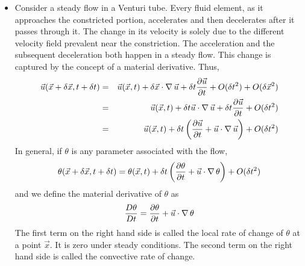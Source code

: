 \begin{itemize}
\item Consider a steady flow in a Venturi tube. Every fluid element, as it approaches the constricted portion, accelerates and then decelerates after it passes through it. The change in
its velocity is solely due to the different velocity field prevalent near the constriction. The acceleration and the subsequent deceleration both happen in a steady flow. This change is
captured by the concept of a material derivative. Thus,
\begin{eqnarray*}
\vec{u}(\vec{x} + \delta\vec{x}, t + \delta{t}) &=& \vec{u}(\vec{x}, t) + \delta\vec{x}\cdot\operatorname{\nabla}{\vec{u}} + \delta{t}\frac{\partial{\vec{u}}}{\partial{t}} + O(\delta{t}^2) + O(\delta\vec{x}^2) \\
 &=& \vec{u}(\vec{x}, t) + \delta{t}\vec{u}\cdot\operatorname{\nabla}{\vec{u}} + \delta{t}\frac{\partial{\vec{u}}}{\partial{t}} + O(\delta{t}^2)  \\
 &=& \vec{u}(\vec{x}, t) + \delta{t}\left(\frac{\partial{\vec{u}}}{\partial{t}} + \vec{u}\cdot\operatorname{\nabla}{\vec{u}}\right) + O(\delta{t}^2)  
\end{eqnarray*}
In general, if $\theta$ is any parameter associated with the flow,
\[
\theta(\vec{x} + \delta\vec{x}, t + \delta{t}) = \theta(\vec{x}, t) + \delta{t}\left(\frac{\partial{\theta}}{\partial{t}} + \vec{u}\cdot\operatorname{\nabla}{\theta}\right) + O(\delta{t}^2)
\]
and we define the material derivative of $\theta$ as
\[
\frac{D{\theta}}{Dt} = \frac{\partial{\theta}}{\partial{t}} + \vec{u}\cdot\operatorname{\nabla}{\theta}
\]
The first term on the right hand side is called the local rate of change of $\theta$ at a point $\vec{x}$. It is zero under steady conditions. The second term on the right hand side is 
called the convective rate of change.
\end{itemize}

